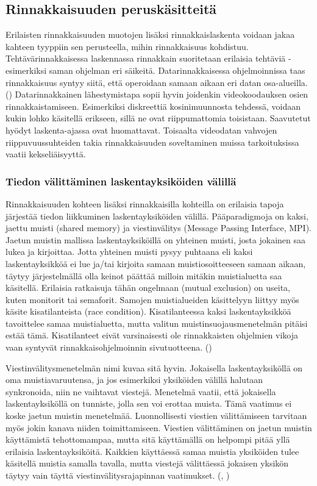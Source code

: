 \subsection{Rinnakkaisuuden peruskäsitteitä}

Erilaisten rinnakkaisuuden muotojen lisäksi rinnakkaislaskenta voidaan jakaa
kahteen tyyppiin sen perusteella, mihin rinnakkaisuus kohdistuu.
Tehtävärinnakkaisessa laskennassa rinnakkain suoritetaan erilaisia
tehtäviä - esimerkiksi saman ohjelman eri säikeitä. Datarinnakkaisessa
ohjelmoinnissa taas rinnakkaisuus syntyy siitä, että operoidaan samaan aikaan
eri datan osa-alueilla. (\citealt{intro}) Datarinnakkainen lähestymistapa sopii hyvin
joidenkin videokoodauksen osien rinnakkaistamiseen. Esimerkiksi diskreettiä
kosinimuunnosta tehdessä, voidaan kukin lohko käsitellä erikseen, sillä ne ovat riippumattomia 
toisistaan. Saavutetut hyödyt laskenta-ajassa ovat huomattavat. Toisaalta
videodatan vahvojen riippuvuussuhteiden takia rinnakkaisuuden soveltaminen
muissa tarkoituksissa vaatii kekseliäisyyttä.

\subsubsection{Tiedon välittäminen laskentayksiköiden välillä}

Rinnakkaisuuden kohteen lisäksi rinnakkaisilla kohteilla on erilaisia tapoja
järjestää tiedon liikkuminen laskentayksiköiden välillä. Pääparadigmoja on
kaksi, jaettu muisti (shared memory) ja viestinvälitys (Message Passing Interface, MPI). Jaetun muistin mallissa
laskentayksiköillä on yhteinen muisti, josta jokainen saa lukea ja kirjoittaa.
Jotta yhteinen muisti pysyy puhtaana eli kaksi laskentayksikköä ei lue ja/tai
kirjoita samaan muistiosoitteeseen samaan aikaan, täytyy järjestelmällä
olla keinot päättää milloin mitäkin muistialuetta saa käsitellä.
Erilaisia ratkaisuja tähän ongelmaan (mutual exclusion) on useita, kuten
monitorit tai semaforit. Samojen muistialueiden käsittelyyn
liittyy myös käsite kisatilanteista (race condition). Kisatilanteessa kaksi
laskentayksikköä tavoittelee samaa muistialuetta, mutta valitun
muistinsuojausmenetelmän pitäisi estää tämä. Kisatilanteet eivät varsinaisesti
ole rinnakkaisten ohjelmien vikoja vaan syntyvät rinnakkaisohjelmoinnin
sivutuotteena. (\citealt{ari})

Viestinvälitysmenetelmän nimi kuvaa sitä hyvin. Jokaisella
laskentayksiköllä on oma muistiavaruutensa, ja jos esimerkiksi  yksiköiden
välillä halutaan synkronoida, niin ne vaihtavat viestejä. Menetelmä vaatii,
että jokaisella laskentayksiköllä on tunniste, jolla sen voi erottaa muista.
Tämä vaatimus ei koske jaetun muistin menetelmää. Luonnollisesti viestien
välittämiseen tarvitaan myös jokin kanava niiden toimittamiseen. Viestien
välittäminen on jaetun muistin käyttämistä tehottomampaa, mutta sitä
käyttämällä on helpompi pitää yllä erilaisia laskentayksiköitä. Kaikkien
käyttäessä samaa muistia yksiköiden tulee käsitellä muistia samalla tavalla,
mutta viestejä välittäessä jokaisen yksikön täytyy vain täyttä
viestinvälitysrajapinnan vaatimukset. (\citealt{intro}, \citealt{rauber})

